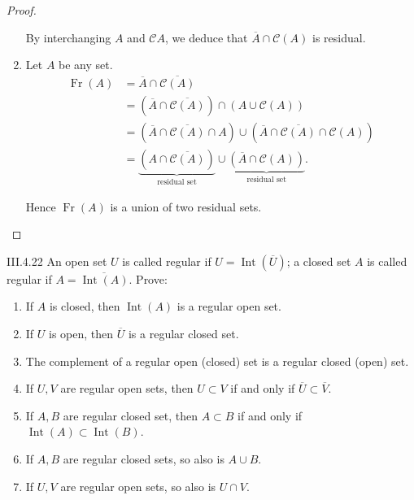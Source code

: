 \begin{proof}
\begin{enumerate}[label={(\arabic*)},itemsep=0pt,leftmargin=*]
		      By interchanging \( A \) and \( \mathscr{C}A \), we deduce that \( \overline{A} \cap \mathscr{C}(A) \) is residual.
		\item Let \(A\) be any set.
		      \begingroup
		      \allowdisplaybreaks%
		      \begin{align*}
			      \operatorname{Fr}(A) & = \overline{A} \cap \overline{\mathscr{C}(A)}                                                                                                       \\
			                           & = (\overline{A} \cap \overline{\mathscr{C}(A)}) \cap (A \cup \mathscr{C}(A))                                                                        \\
			                           & = (\overline{A} \cap \overline{\mathscr{C}(A)} \cap A) \cup (\overline{A} \cap \overline{\mathscr{C}(A)} \cap \mathscr{C}(A))                       \\
			                           & = \underbrace{(A \cap \overline{\mathscr{C}(A)})}_{\text{residual set}} \cup \underbrace{(\overline{A} \cap \mathscr{C}(A))}_{\text{residual set}}.
		      \end{align*}
		      \endgroup

		      Hence \( \operatorname{Fr}(A) \) is a union of two residual sets.
	\end{enumerate}
\end{proof}

\begin{problem}{III.4.22}
An open set \(U\) is called regular if \(U = \operatorname{Int}(\overline{U})\); a closed set \(A\) is called regular if \(A = \overline{\operatorname{Int}(A)}\). Prove:
\begin{enumerate}[leftmargin=*,label={(\alph*)},itemsep=0pt]
	\item If \(A\) is closed, then \(\operatorname{Int}(A)\) is a regular open set.
	\item If \(U\) is open, then \(\overline{U}\) is a regular closed set.
	\item The complement of a regular open (closed) set is a regular closed (open) set.
	\item If \(U, V\) are regular open sets, then \(U \subset V\) if and only if \( \overline{U} \subset \overline{V} \).
	\item If \(A, B\) are regular closed set, then \( A \subset B \) if and only if \( \operatorname{Int}(A) \subset \operatorname{Int}(B) \).
	\item If \(A, B\) are regular closed sets, so also is \(A \cup B\).
	\item If \(U, V\) are regular open sets, so also is \(U \cap V\).
\end{enumerate}
\end{problem}

